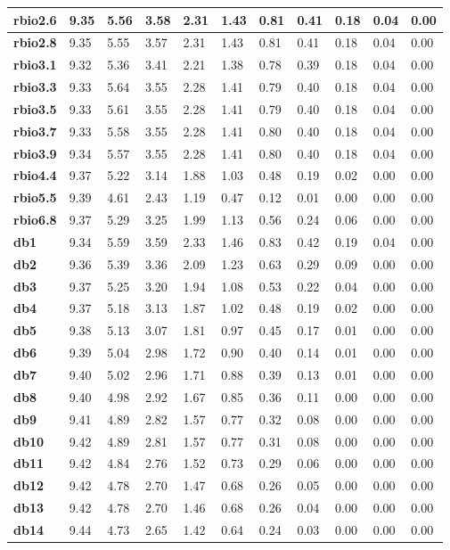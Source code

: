 \begin{tiny}
\begin{longtable}{|l|l|l|l|l|l|l|l|l|l|l|}
\textbf{rbio2.6}&9.35&5.56&3.58&2.31&1.43&0.81&0.41&0.18&0.04&0.00\\\hline
\textbf{rbio2.8}&9.35&5.55&3.57&2.31&1.43&0.81&0.41&0.18&0.04&0.00\\\hline
\textbf{rbio3.1}&9.32&5.36&3.41&2.21&1.38&0.78&0.39&0.18&0.04&0.00\\\hline
\textbf{rbio3.3}&9.33&5.64&3.55&2.28&1.41&0.79&0.40&0.18&0.04&0.00\\\hline
\textbf{rbio3.5}&9.33&5.61&3.55&2.28&1.41&0.79&0.40&0.18&0.04&0.00\\\hline
\textbf{rbio3.7}&9.33&5.58&3.55&2.28&1.41&0.80&0.40&0.18&0.04&0.00\\\hline
\textbf{rbio3.9}&9.34&5.57&3.55&2.28&1.41&0.80&0.40&0.18&0.04&0.00\\\hline
\textbf{rbio4.4}&9.37&5.22&3.14&1.88&1.03&0.48&0.19&0.02&0.00&0.00\\\hline
\textbf{rbio5.5}&9.39&4.61&2.43&1.19&0.47&0.12&0.01&0.00&0.00&0.00\\\hline
\textbf{rbio6.8}&9.37&5.29&3.25&1.99&1.13&0.56&0.24&0.06&0.00&0.00\\\hline
\textbf{db1}&9.34&5.59&3.59&2.33&1.46&0.83&0.42&0.19&0.04&0.00\\\hline
\textbf{db2}&9.36&5.39&3.36&2.09&1.23&0.63&0.29&0.09&0.00&0.00\\\hline
\textbf{db3}&9.37&5.25&3.20&1.94&1.08&0.53&0.22&0.04&0.00&0.00\\\hline
\textbf{db4}&9.37&5.18&3.13&1.87&1.02&0.48&0.19&0.02&0.00&0.00\\\hline
\textbf{db5}&9.38&5.13&3.07&1.81&0.97&0.45&0.17&0.01&0.00&0.00\\\hline
\textbf{db6}&9.39&5.04&2.98&1.72&0.90&0.40&0.14&0.01&0.00&0.00\\\hline
\textbf{db7}&9.40&5.02&2.96&1.71&0.88&0.39&0.13&0.01&0.00&0.00\\\hline
\textbf{db8}&9.40&4.98&2.92&1.67&0.85&0.36&0.11&0.00&0.00&0.00\\\hline
\textbf{db9}&9.41&4.89&2.82&1.57&0.77&0.32&0.08&0.00&0.00&0.00\\\hline
\textbf{db10}&9.42&4.89&2.81&1.57&0.77&0.31&0.08&0.00&0.00&0.00\\\hline
\textbf{db11}&9.42&4.84&2.76&1.52&0.73&0.29&0.06&0.00&0.00&0.00\\\hline
\textbf{db12}&9.42&4.78&2.70&1.47&0.68&0.26&0.05&0.00&0.00&0.00\\\hline
\textbf{db13}&9.42&4.78&2.70&1.46&0.68&0.26&0.04&0.00&0.00&0.00\\\hline
\textbf{db14}&9.44&4.73&2.65&1.42&0.64&0.24&0.03&0.00&0.00&0.00\\\hline

\end{longtable}
\end{tiny}
